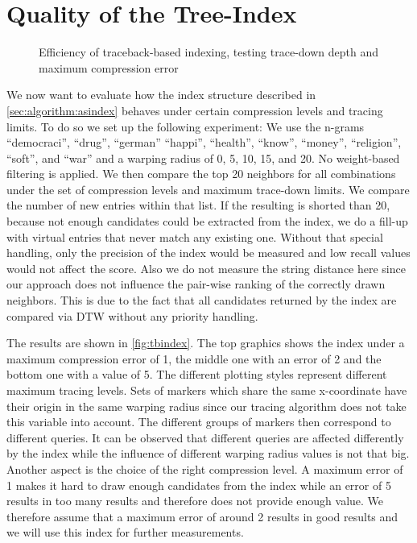 \section{Quality of the Tree-Index}
\label{sec:evaluation:tb}

\begin{figure}
    \centering
    
    \caption{Efficiency of traceback-based indexing, testing trace-down depth and maximum compression error}
    \label{fig:tbindex}
\end{figure}

We now want to evaluate how the index structure described in \autoref{sec:algorithm:asindex} behaves under certain compression levels and tracing limits. To do so we set up the following experiment: We use the n-grams \enquote{democraci}, \enquote{drug}, \enquote{german} \enquote{happi}, \enquote{health}, \enquote{know}, \enquote{money}, \enquote{religion}, \enquote{soft}, and \enquote{war} and a warping radius of \num{0}, \num{5}, \num{10}, \num{15}, and \num{20}. No weight-based filtering is applied. We then compare the top \num{20} neighbors for all combinations under the set of compression levels and maximum trace-down limits. We compare the number of new entries within that list. If the resulting is shorted than \num{20}, because not enough candidates could be extracted from the index, we do a fill-up with virtual entries that never match any existing one. Without that special handling, only the precision of the index would be measured and low recall values would not affect the score. Also we do not measure the string distance here since our approach does not influence the pair-wise ranking of the correctly drawn neighbors. This is due to the fact that all candidates returned by the index are compared via DTW without any priority handling.

The results are shown in \autoref{fig:tbindex}. The top graphics shows the index under a maximum compression error of \num{1}, the middle one with an error of \num{2} and the bottom one with a value of \num{5}. The different plotting styles represent different maximum tracing levels. Sets of markers which share the same x-coordinate have their origin in the same warping radius since our tracing algorithm does not take this variable into account. The different groups of markers then correspond to different queries. It can be observed that different queries are affected differently by the index while the influence of different warping radius values is not that big. Another aspect is the choice of the right compression level. A maximum error of \num{1} makes it hard to draw enough candidates from the index while an error of \num{5} results in too many results and therefore does not provide enough value. We therefore assume that a maximum error of around \num{2} results in good results and we will use this index for further measurements.

